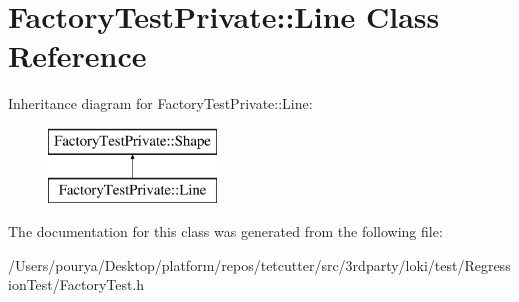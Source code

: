 \hypertarget{classFactoryTestPrivate_1_1Line}{}\section{Factory\+Test\+Private\+:\+:Line Class Reference}
\label{classFactoryTestPrivate_1_1Line}
Inheritance diagram for Factory\+Test\+Private\+:\+:Line\+:\begin{figure}[H]
\begin{center}
\leavevmode
\includegraphics[height=2.000000cm]{classFactoryTestPrivate_1_1Line}
\end{center}
\end{figure}


The documentation for this class was generated from the following file\+:\begin{DoxyCompactItemize}
\item 
/\+Users/pourya/\+Desktop/platform/repos/tetcutter/src/3rdparty/loki/test/\+Regression\+Test/Factory\+Test.\+h\end{DoxyCompactItemize}
